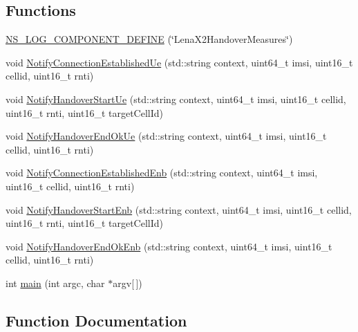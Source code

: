 \subsection*{Functions}
\begin{DoxyCompactItemize}
\item 
\hyperlink{lena-x2-handover-measures_8cc_adf9d656f215553eb58a474f76b6f877b}{N\+S\+\_\+\+L\+O\+G\+\_\+\+C\+O\+M\+P\+O\+N\+E\+N\+T\+\_\+\+D\+E\+F\+I\+NE} (\char`\"{}Lena\+X2\+Handover\+Measures\char`\"{})
\item 
void \hyperlink{lena-x2-handover-measures_8cc_a7b068dcdfdae75954b1d6a533108413e}{Notify\+Connection\+Established\+Ue} (std\+::string context, uint64\+\_\+t imsi, uint16\+\_\+t cellid, uint16\+\_\+t rnti)
\item 
void \hyperlink{lena-x2-handover-measures_8cc_a86f5a4f1ce25b40b625682a16b714f03}{Notify\+Handover\+Start\+Ue} (std\+::string context, uint64\+\_\+t imsi, uint16\+\_\+t cellid, uint16\+\_\+t rnti, uint16\+\_\+t target\+Cell\+Id)
\item 
void \hyperlink{lena-x2-handover-measures_8cc_a62f1fe4dd47681ddfbff0249874e5653}{Notify\+Handover\+End\+Ok\+Ue} (std\+::string context, uint64\+\_\+t imsi, uint16\+\_\+t cellid, uint16\+\_\+t rnti)
\item 
void \hyperlink{lena-x2-handover-measures_8cc_a9ebcea277a72efa6dbfd310068addf75}{Notify\+Connection\+Established\+Enb} (std\+::string context, uint64\+\_\+t imsi, uint16\+\_\+t cellid, uint16\+\_\+t rnti)
\item 
void \hyperlink{lena-x2-handover-measures_8cc_a98a48f4218409f1681fc99d3d070d8ee}{Notify\+Handover\+Start\+Enb} (std\+::string context, uint64\+\_\+t imsi, uint16\+\_\+t cellid, uint16\+\_\+t rnti, uint16\+\_\+t target\+Cell\+Id)
\item 
void \hyperlink{lena-x2-handover-measures_8cc_aef8eb0154877f4690ac5062d7875d5f1}{Notify\+Handover\+End\+Ok\+Enb} (std\+::string context, uint64\+\_\+t imsi, uint16\+\_\+t cellid, uint16\+\_\+t rnti)
\item 
int \hyperlink{lena-x2-handover-measures_8cc_a0ddf1224851353fc92bfbff6f499fa97}{main} (int argc, char $\ast$argv\mbox{[}$\,$\mbox{]})
\end{DoxyCompactItemize}


\subsection{Function Documentation}
